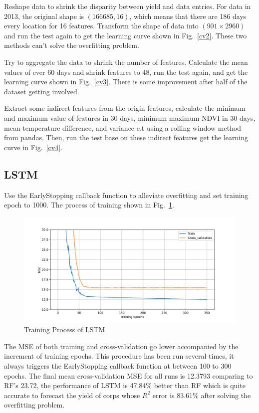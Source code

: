 \documentclass[conference]{IEEEtran}
\begin{document}
  Reshape data to shrink the disparity between yield and data entries. For data in 2013, the original shape is $(166685,16)$, which means that there are 186 days every location for 16 features. Transform the shape of data into $(901\times2960)$ and run the test again to get the learning curve shown in Fig.~\ref{cv2}. These two methods can't solve the overfitting problem.

  Try to aggregate the data to shrink the number of features. Calculate the mean values of ever 60 days and shrink features to 48, run the test again, and get the learning curve shown in Fig.~\ref{cv3}. There is some improvement after half of the dataset getting involved.

  Extract some indirect features from the origin features, calculate the minimum and maximum value of features in 30 days, minimum maximum NDVI in 30 days, mean temperature difference, and variance e.t using a rolling window method from pandas. Then, run the test base on these indirect features get the learning curve in Fig.~\ref{cv4}.

\subsection{LSTM}
Use the EarlyStopping callback function to alleviate overfitting and set training epoch to 1000. The process of training shown in Fig.~\ref{fig:train}.

\begin{figure}[htbp]
  \centerline{\includegraphics[width=\linewidth]{figures/lp.png}}
  \caption{Training Process of LSTM}
  \label{fig:train}
\end{figure}

The MSE of both training and cross-validation go lower accompanied by the increment of training epochs. This procedure has been run several times, it always triggers the EarlyStopping callback function at between 100 to 300 epochs. The final mean cross-validation MSE for all runs is 12.3793 comparing to RF's 23.72, the performance of LSTM is 47.84\% better than RF which is quite accurate to forecast the yield of corps whose $R^2$ error is 83.61\% after solving the overfitting problem.
\end{document}
